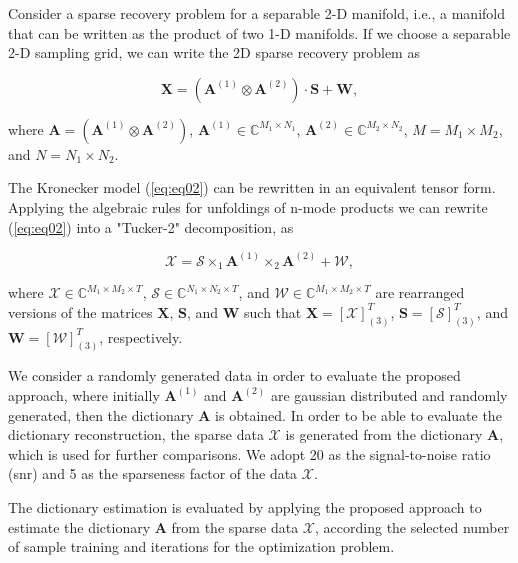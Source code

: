 \documentclass{article}
\begin{document}
Consider a sparse recovery problem for a separable 2-D manifold, i.e., a manifold that can be written as the product of two 1-D manifolds. If we choose a separable 2-D sampling grid, we can write the 2D sparse recovery problem as

\begin{equation}\label{eq:eq02}
\boldsymbol{X} = (\boldsymbol{A}^{(1)} \otimes \boldsymbol{A}^{(2)}) \cdot \boldsymbol{S} + \boldsymbol{W},
\end{equation}

where $\boldsymbol{A} = (\boldsymbol{A}^{(1)} \otimes \boldsymbol{A}^{(2)})$, $\boldsymbol{A}^{(1)} \in \mathbb{C}^{M_1 \times N_1}$, $\boldsymbol{A}^{(2)} \in \mathbb{C}^{M_2 \times N_2}$, $M = M_1 \times M_2$, and $N = N_1 \times N_2$.

The Kronecker model (\ref{eq:eq02}) can be rewritten in an equivalent tensor form. Applying the algebraic rules for unfoldings of n-mode products \cite{roemer2014tensor} we can rewrite (\ref{eq:eq02}) into a "Tucker-2" decomposition, as

\begin{equation}\label{eq:eq03}
\boldsymbol{\mathcal{X}} = \boldsymbol{\mathcal{S}} \times_1 \boldsymbol{A}^{(1)} \times_2 \boldsymbol{A}^{(2)} +  \boldsymbol{\mathcal{W}},
\end{equation}

where $\boldsymbol{\mathcal{X}} \in \mathbb{C}^{M_1 \times M_2 \times T}$, $\boldsymbol{\mathcal{S}} \in \mathbb{C}^{N_1 \times N_2 \times T}$, and $\boldsymbol{\mathcal{W}} \in \mathbb{C}^{M_1 \times M_2 \times T}$ are rearranged versions of the matrices $\boldsymbol{X}$, $\boldsymbol{S}$, and $\boldsymbol{W}$ such that $\boldsymbol{X} = [\boldsymbol{\mathcal{X}}]_{(3)}^T$, $\boldsymbol{S} = [\boldsymbol{\mathcal{S}}]_{(3)}^T$, and $\boldsymbol{W} = [\boldsymbol{\mathcal{W}}]_{(3)}^T$, respectively.

We consider a randomly generated data in order to evaluate the proposed approach, where initially $\boldsymbol{A}^{(1)}$ and $\boldsymbol{A}^{(2)}$ are gaussian distributed and randomly generated, then the dictionary $\boldsymbol{A}$ is obtained. In order to be able to evaluate the dictionary reconstruction, the sparse data $\boldsymbol{\mathcal{X}}$ is generated from the dictionary $\boldsymbol{A}$, which is used for further comparisons. We adopt 20 as the signal-to-noise ratio (snr) and 5 as the sparseness factor of the data $\boldsymbol{\mathcal{X}}$. 

The dictionary estimation is evaluated by applying the proposed approach to estimate the dictionary $\boldsymbol{A}$ from the sparse data $\boldsymbol{\mathcal{X}}$, according the selected number of sample training and iterations for the optimization problem.
\end{document}
